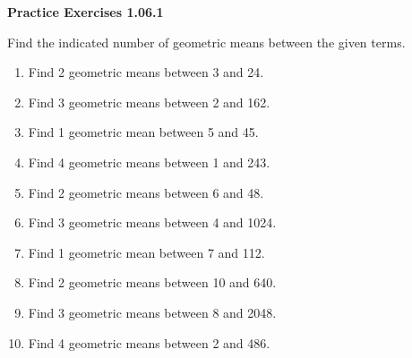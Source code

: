 \vspace{0.3ex}
\noindent\textbf{Practice Exercises 1.06.1}

\vspace{0.2ex}

Find the indicated number of geometric means between the given terms.
\begin{enumerate}
    \item Find 2 geometric means between 3 and 24.
    \item Find 3 geometric means between 2 and 162.
    \item Find 1 geometric mean between 5 and 45.
    \item Find 4 geometric means between 1 and 243.
    \item Find 2 geometric means between 6 and 48.
    \item Find 3 geometric means between 4 and 1024.
    \item Find 1 geometric mean between 7 and 112.
    \item Find 2 geometric means between 10 and 640.
    \item Find 3 geometric means between 8 and 2048.
    \item Find 4 geometric means between 2 and 486.
\end{enumerate}
